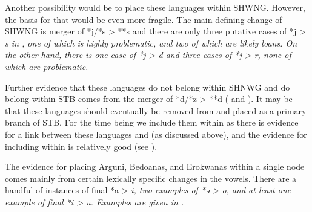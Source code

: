 Another possibility would be to place these languages within SHWNG.
However, the basis for that would be even more fragile.
The main defining change of SHWNG is merger of *j/*s > **s \citep[52]{Kamholz2014}
and there are only three putative cases of *j > \it{s} in , one of which is highly problematic,
and two of which are likely loans.
On the other hand,
there is one case of *j > \it{d}
and three cases of *j > \it{r},
none of which are problematic.

Further evidence that these languages do not belong within SHNWG
and do belong within STB comes from the merger of *d/*z > **d ( and ).
It may be that these languages should eventually be removed from
 and placed as a primary branch of STB.
For the time being we include them within 
as there is evidence for a link between these languages
and  (as discussed above),
and the evidence for including  within 
is relatively good (see ).

The evidence for placing Arguni,
Bedoanas, and Erokwanas within a single node comes mainly from
certain lexically specific changes in the vowels.
There are a handful of instances of final *a > \it{i},
two examples of *ə > \it{o},
and at least one example of final *i > \it{u}.
Examples are given in .

